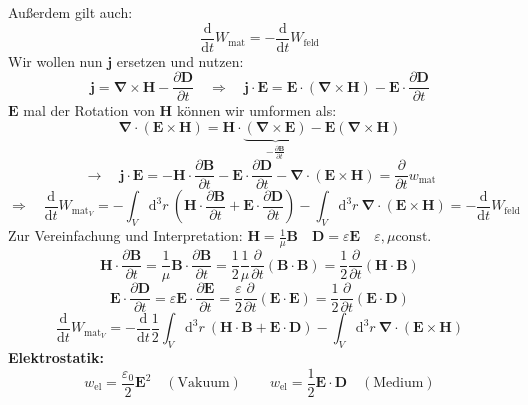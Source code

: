 \documentclass[titlepage,11pt,a4paper,ngerman]{report}
\newcommand{\tx}[1]{\textrm{#1}}
\newcommand{\const}{\tx{const.}}
\newcommand{\ub}[1]{\underbrace{#1}}
\newcommand{\dd}{\tx{d}}
\newcommand{\prt}[2]{\frac{\partial #1}{\partial #2}}
\newcommand{\prd}[2]{\frac{\tx{d} #1}{\tx{d} #2}}
\renewcommand{\vec}[1]{\boldsymbol{#1}}
\renewcommand{\epsilon}{\varepsilon}
\newcommand{\vabla}{\boldsymbol{\nabla}}
\begin{document}
Außerdem gilt auch:
\begin{equation*}
\prd{}{t} W_{\tx{mat}} = - \prd{}{t} W_{\tx{feld}}
\end{equation*}
Wir wollen nun $ \vec{j} $ ersetzen und nutzen:
\begin{equation*}
\vec{j} = \vabla \times \vec{H} - \prt{\vec{D}}{t} \quad \Rightarrow \quad \vec{j} \cdot \vec{E} = \vec{E} \cdot (\vabla \times \vec{H}) - \vec{E} \cdot \prt{\vec{D}}{t}
\end{equation*}
$ \vec{E} $ mal der Rotation von $ \vec{H} $ können wir umformen als:
\begin{equation*}
\vabla \cdot (\vec{E} \times \vec{H}) = \vec{H} \cdot \ub{(\vabla \times \vec{E})}_{- \prt{\vec{B}}{t}} - \vec{E} (\vabla \times \vec{H})
\end{equation*}
\begin{equation*}
\rightarrow \quad  \vec{j} \cdot \vec{E} = - \vec{H} \cdot \prt{\vec{B}}{t} - \vec{E} \cdot \prt{\vec{D}}{t} - \vabla \cdot (\vec{E} \times \vec{H}) = \prt{}{t} w_{\tx{mat}}
\end{equation*}
\begin{equation*}
\Rightarrow \quad \prd{}{t} W_{\tx{mat}_V} = - \int_V \dd^3 r \ \left(\vec{H} \cdot \prt{\vec{B}}{t} + \vec{E} \cdot \prt{\vec{D}}{t} \right) - \int_V \dd^3 r \ \vabla \cdot (\vec{E} \times \vec{H}) = - \prd{}{t} W_{\tx{feld}}
\end{equation*}
Zur Vereinfachung und Interpretation: $ \vec{H} = \frac{1}{\mu} \vec{B} \quad \vec{D} = \epsilon \vec{E} \quad \epsilon, \mu \const $
\begin{equation*}
\vec{H} \cdot \prt{\vec{B}}{t} = \frac{1}{\mu} \vec{B} \cdot \prt{\vec{B}}{t} = \frac{1}{2} \frac{1}{\mu} \prt{}{t} (\vec{B} \cdot \vec{B}) = \frac{1}{2} \prt{}{t} (\vec{H} \cdot \vec{B})
\end{equation*}
\begin{equation*}
\vec{E} \cdot \prt{\vec{D}}{t} = \epsilon \vec{E} \cdot \prt{\vec{E}}{t} = \frac{\epsilon}{2} \prt{}{t} (\vec{E} \cdot \vec{E}) = \frac{1}{2} \prt{}{t} (\vec{E} \cdot \vec{D})
\end{equation*}
\begin{equation*}
\prd{}{t} W_{\tx{mat}_V} = - \prd{}{t} \frac{1}{2} \int_V \dd^3r \ (\vec{H} \cdot \vec{B} + \vec{E} \cdot \vec{D}) - \int_V \dd^3r \ \vabla \cdot (\vec{E} \times \vec{H})
\end{equation*}
\textbf{Elektrostatik:}
\begin{equation*}
w_{\tx{el}} = \frac{\epsilon_0}{2} \vec{E}^2 \quad (\tx{Vakuum}) \qquad w_{\tx{el}} = \frac{1}{2} \vec{E} \cdot \vec{D} \quad (\tx{Medium})
\end{equation*}
\end{document}

